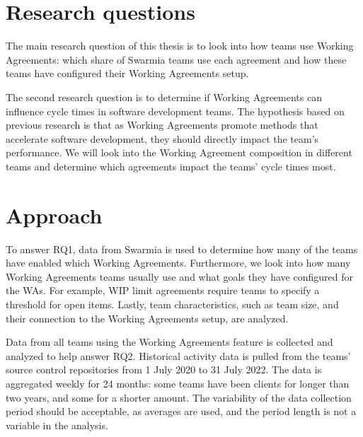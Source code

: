 \section{Research questions}

The main research question of this thesis is to look into how teams use Working Agreements: which share of Swarmia teams use each agreement and how these teams have configured their Working Agreements setup. 

The second research question is to determine if Working Agreements can influence cycle times in software development teams. The hypothesis based on previous research is that as Working Agreements promote methods that accelerate software development, they should directly impact the team's performance. We will look into the Working Agreement composition in different teams and determine which agreements impact the teams' cycle times most. 

\section{Approach}

To answer RQ1, data from Swarmia is used to determine how many of the teams have enabled which Working Agreements. Furthermore, we look into how many Working Agreements teams usually use and what goals they have configured for the WAs. For example, WIP limit agreements require teams to specify a threshold for open items. Lastly, team characteristics, such as team size, and their connection to the Working Agreements setup, are analyzed.

Data from all teams using the Working Agreements feature is collected and analyzed to help answer RQ2. Historical activity data is pulled from the teams' source control repositories from 1 July 2020 to 31 July 2022. The data is aggregated weekly for 24 months: some teams have been clients for longer than two years, and some for a shorter amount. The variability of the data collection period should be acceptable, as averages are used, and the period length is not a variable in the analysis.

